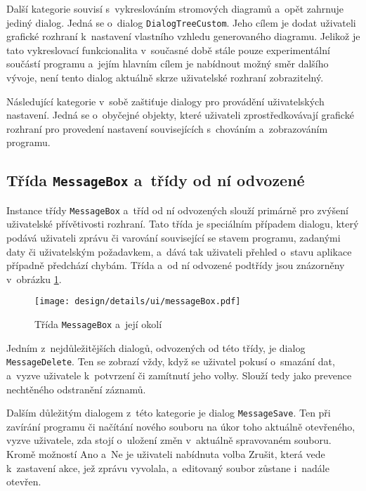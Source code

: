 		Další kategorie souvisí s~vykreslováním stromových diagramů a~opět zahrnuje jediný dialog. Jedná se o~dialog \texttt{DialogTreeCustom}. Jeho cílem je dodat uživateli grafické rozhraní k~nastavení vlastního vzhledu generovaného diagramu. Jelikož je tato vykreslovací funkcionalita v~současné době stále pouze experimentální součástí programu a~jejím hlavním cílem je nabídnout možný směr dalšího vývoje, není tento dialog aktuálně skrze uživatelské rozhraní zobrazitelný.\par
		Následující kategorie v~sobě zaštiťuje dialogy pro provádění uživatelských nastavení. Jedná se o~obyčejné objekty, které uživateli zprostředkovávají grafické rozhraní pro provedení nastavení souvisejících s~chováním a~zobrazováním programu.\par
		
		\subsection*{Třída \texttt{MessageBox} a~třídy od ní odvozené}
		Instance třídy \texttt{MessageBox} a~tříd od ní odvozených slouží primárně pro zvýšení uživatelské přívětivosti rozhraní. Tato třída je speciálním případem dialogu, který podává uživateli zprávu či varování související se stavem programu, zadanými daty či uživatelským požadavkem, a~dává tak uživateli přehled o~stavu aplikace případně předchází chybám. Třída a~od ní odvozené podtřídy jsou znázorněny v~obrázku \ref{fig:designDetailMessageBox}.\par
		\begin{figure}[h]
			\centering
			\texttt{[image: design/details/ui/messageBox.pdf]}
			\caption{Třída \texttt{MessageBox} a~její okolí}
			\label{fig:designDetailMessageBox}
		\end{figure}
		Jedním z~nejdůležitějších dialogů, odvozených od této třídy, je dialog \texttt{MessageDelete}. Ten se zobrazí vždy, když se uživatel pokusí o~smazání dat, a~vyzve uživatele k~potvrzení či zamítnutí jeho volby. Slouží tedy jako prevence nechtěného odstranění záznamů.\par
		Dalším důležitým dialogem z~této kategorie je dialog \texttt{MessageSave}. Ten při zavírání programu či načítání nového souboru na úkor toho aktuálně otevřeného, vyzve uživatele, zda stojí o~uložení změn v~aktuálně spravovaném souboru. Kromě možností Ano a~Ne je uživateli nabídnuta volba Zrušit, která vede k~zastavení akce, jež zprávu vyvolala, a~editovaný soubor zůstane i~nadále otevřen.\par
		
